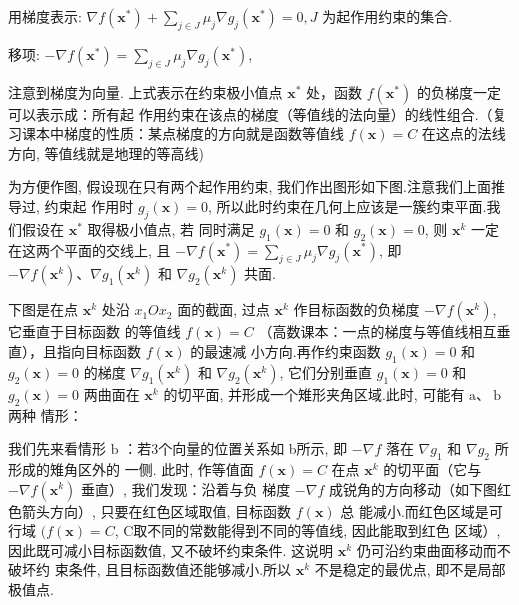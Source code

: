 用梯度表示: $ \nabla f\left(\mathbf{x}^{*}\right)+\sum_{j \in J} \mu_{j} \nabla g_{j}\left(\mathbf{x}^{*}\right)=0, J $ 为起作用约束的集合.

移项: $ -\nabla f\left(\mathbf{x}^{*}\right)=\sum_{j \in J} \mu_{j} \nabla g_{j}\left(\mathbf{x}^{*}\right) $,

注意到梯度为向量. 上式表示在约束极小值点 $ \mathbf{x}^{*} $ 处，函数 $ f\left(\mathbf{x}^{*}\right) $ 的负梯度一定可以表示成：所有起 作用约束在该点的梯度（等值线的法向量）的线性组合.（复习课本中梯度的性质：某点梯度的方向就是函数等值线 $ f(\mathbf{x})=C $ 在这点的法线方向, 等值线就是地理的等高线)

为方便作图, 假设现在只有两个起作用约束, 我们作出图形如下图.注意我们上面推导过, 约束起 作用时 $ g_{j}(\mathbf{x})=0 $, 所以此时约束在几何上应该是一簇约束平面.我们假设在 $ \mathbf{x}^{*} $ 取得极小值点, 若 同时满足 $ g_{1}(\mathbf{x})=0 $ 和 $ g_{2}(\mathbf{x})=0 $, 则 $ \mathbf{x}^{k} $ 一定在这两个平面的交线上, 且 $ -\nabla f\left(\mathbf{x}^{*}\right)=\sum_{j \in J} \mu_{j} \nabla g_{j}\left(\mathbf{x}^{*}\right) $, 即 $ -\nabla f\left(\mathbf{x}^{k}\right) 、 \nabla g_{1}\left(\mathbf{x}^{k}\right) $ 和 $ \nabla g_{2}\left(\mathbf{x}^{k}\right) $ 共面.


下图是在点 $ \mathbf{x}^{k} $ 处沿 $ x_{1} O x_{2} $ 面的截面, 过点 $ \mathbf{x}^{k} $ 作目标函数的负梯度 $ -\nabla f\left(\mathbf{x}^{k}\right) $, 它垂直于目标函数 的等值线 $ f(\mathbf{x})=C $ （高数课本：一点的梯度与等值线相互垂直），且指向目标函数 $ f(\mathbf{x}) $ 的最速减 小方向.再作约束函数 $ g_{1}(\mathbf{x})=0 $ 和 $ g_{2}(\mathbf{x})=0 $ 的梯度 $ \nabla g_{1}\left(\mathbf{x}^{k}\right) $ 和 $ \nabla g_{2}\left(\mathbf{x}^{k}\right) $, 它们分别垂直 $ g_{1}(\mathbf{x})=0 $ 和 $ g_{2}(\mathbf{x})=0 $ 两曲面在 $ \mathbf{x}^{k} $ 的切平面, 并形成一个雉形夹角区域.此时, 可能有 $ \mathrm{a} 、 \mathrm{~b} $ 两种 情形：

我们先来看情形 $\mathrm{b}$ ：若3个向量的位置关系如 b所示, 即 $-\nabla f$ 落在 $\nabla g_{1}$ 和 $\nabla g_{2}$ 所形成的雉角区外的 一侧. 此时, 作等值面 $f(\mathbf{x})=C$ 在点 $\mathbf{x}^{k}$ 的切平面（它与 $-\nabla f\left(\mathbf{x}^{k}\right)$ 垂直）, 我们发现：沿着与负 梯度 $-\nabla f$ 成锐角的方向移动（如下图红色箭头方向）, 只要在红色区域取值, 目标函数 $f(\mathbf{x})$ 总 能减小.而红色区域是可行域 $(f(\mathbf{x})=C$, C取不同的常数能得到不同的等值线, 因此能取到红色 区域）, 因此既可减小目标函数值, 又不破坏约束条件. 这说明 $\mathbf{x}^{k}$ 仍可沿约束曲面移动而不破坏约 束条件, 且目标函数值还能够减小.所以 $\mathbf{x}^{k}$ 不是稳定的最优点, 即不是局部极值点.

